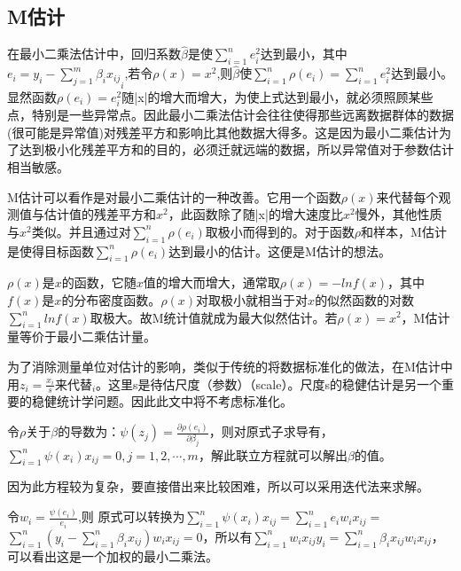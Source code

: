 \documentclass[english]{article}\usepackage[]{graphicx}\usepackage[]{color}
\begin{document}
\subsection{M估计}

在最小二乘法估计中，回归系数$\hat{\beta}$是使${\displaystyle \sum_{i=1}^{n}e_{i}^{2}}$达到最小，其中${\displaystyle e_{i}=y_{i}-\sum_{j=1}^{m}\beta_{i}x_{ij}}_{i}$,若令$\rho(x)=x^{2}$,则$\hat{\beta}$使${\displaystyle \sum_{i=1}^{n}\rho(e_{i})=\sum_{i=1}^{n}e_{i}^{2}}$达到最小。显然函数$\rho(e_{i})=e_{i}^{2}$随|x|的增大而增大，为使上式达到最小，就必须照顾某些点，特别是一些异常点。因此最小二乘法估计会往往使得那些远离数据群体的数据(很可能是异常值)对残差平方和影响比其他数据大得多。这是因为最小二乘估计为了达到极小化残差平方和的目的，必须迁就远端的数据，所以异常值对于参数估计相当敏感。

M估计可以看作是对最小二乘估计的一种改善。它用一个函数$\rho(x)$来代替每个观测值与估计值的残差平方和$x^{2}$，此函数除了随|x|的增大速度比$x^{2}$慢外，其他性质与$x^{2}$类似。并且通过对${\displaystyle \sum_{i=1}^{n}\rho(e_{i})}$取极小而得到的。对于函数$\rho$和样本，M估计是使得目标函数${\textstyle {\displaystyle \sum_{i=1}^{n}\rho(e_{i})}}$达到最小的估计。这便是M估计的想法。

$\rho(x)$是$x$的函数，它随$x$值的增大而增大，通常取$\rho(x)=-lnf(x)$，其中$f(x)$是$x$的分布密度函数。$\rho(x)$对取极小就相当于对$x$的似然函数的对数${\displaystyle \sum_{i=1}^{n}lnf(x)}$取极大。故M统计值就成为最大似然估计。若$\rho(x)=x^{2}$，M估计量等价于最小二乘估计量。

为了消除测量单位对估计的影响，类似于传统的将数据标准化的做法，在M估计中用$z_{i}=\frac{x_{i}}{s}$来代替$_{i}$。这里s是待估尺度（参数）（scale）。尺度s的稳健估计是另一个重要的稳健统计学问题。因此此文中将不考虑标准化。

令$\rho$关于$\beta$的导数为：$\psi(z_{j})=\frac{\partial\rho(e_{i})}{\partial\beta_{j}}$，则对原式子求导有，${\textstyle {\displaystyle \sum_{i=1}^{n}\psi(x_{i})x_{ij}}}=0,j=1,2,\cdots,m$，解此联立方程就可以解出$\beta$的值。

因为此方程较为复杂，要直接借出来比较困难，所以可以采用迭代法来求解。

令$w_{i}=\frac{\psi(e_{i})}{e_{i}}$,则 原式可以转换为${\textstyle {\displaystyle \sum_{i=1}^{n}\psi(x_{i})x_{ij}}}=$${\displaystyle \sum_{i=1}^{n}e_{i}}w_{i}x_{ij}=$${\displaystyle \sum_{i=1}^{n}({\displaystyle y_{i}-\sum_{i=1}^{n}\beta_{i}x_{ij}})w_{i}x_{ij}=0}$，所以有${\textstyle {\displaystyle \sum_{i=1}^{n}{\displaystyle w_{i}x_{ij}y_{i}}=\sum_{i=1}^{n}\beta_{i}x_{ij}w_{i}x_{ij}}}$，可以看出这是一个加权的最小二乘法。
\end{document}
